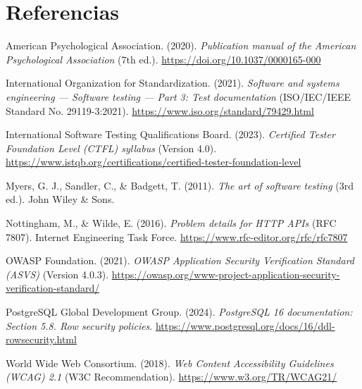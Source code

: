 \documentclass[stu,12pt,a4paper]{apa7}
\begin{document}
\section{Referencias}\label{referencias}

\noindent\hangindent=0.5in American Psychological Association. (2020). \emph{Publication manual of the American Psychological Association} (7th ed.). \url{https://doi.org/10.1037/0000165-000}

\noindent\hangindent=0.5in International Organization for Standardization. (2021). \emph{Software and systems engineering --- Software testing --- Part 3: Test documentation} (ISO/IEC/IEEE Standard No. 29119-3:2021). \url{https://www.iso.org/standard/79429.html}

\noindent\hangindent=0.5in International Software Testing Qualifications Board. (2023). \emph{Certified Tester Foundation Level (CTFL) syllabus} (Version 4.0). \url{https://www.istqb.org/certifications/certified-tester-foundation-level}

\noindent\hangindent=0.5in Myers, G. J., Sandler, C., \& Badgett, T. (2011). \emph{The art of software testing} (3rd ed.). John Wiley \& Sons.

\noindent\hangindent=0.5in Nottingham, M., \& Wilde, E. (2016). \emph{Problem details for HTTP APIs} (RFC 7807). Internet Engineering Task Force. \url{https://www.rfc-editor.org/rfc/rfc7807}

\noindent\hangindent=0.5in OWASP Foundation. (2021). \emph{OWASP Application Security Verification Standard (ASVS)} (Version 4.0.3). \url{https://owasp.org/www-project-application-security-verification-standard/}

\noindent\hangindent=0.5in PostgreSQL Global Development Group. (2024). \emph{PostgreSQL 16 documentation: Section 5.8. Row security policies}. \url{https://www.postgresql.org/docs/16/ddl-rowsecurity.html}

\noindent\hangindent=0.5in World Wide Web Consortium. (2018). \emph{Web Content Accessibility Guidelines (WCAG) 2.1} (W3C Recommendation). \url{https://www.w3.org/TR/WCAG21/}
\end{document}
